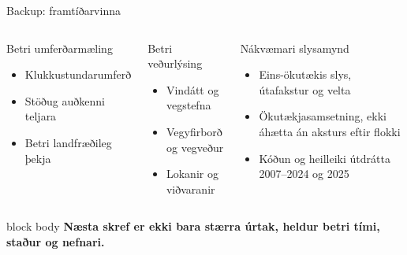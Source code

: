 \documentclass[aspectratio=169,11pt]{beamer}
\newcommand{\takeaway}[1]{%
  \begin{beamercolorbox}[rounded=true,sep=0.75em,wd=0.94\linewidth]{block body}
    \centering\color{navy}\bfseries #1
  \end{beamercolorbox}}
\begin{document}
\begin{frame}{Backup: framtíðarvinna}
\begin{columns}[T,onlytextwidth]
\begin{block}{Betri umferðarmæling}
\begin{itemize}\small
  \item Klukkustundarumferð
  \item Stöðug auðkenni teljara
  \item Betri landfræðileg þekja
\end{itemize}
\end{block}
\begin{block}{Betri veðurlýsing}
\begin{itemize}\small
  \item Vindátt og vegstefna
  \item Vegyfirborð og vegveður
  \item Lokanir og viðvaranir
\end{itemize}
\end{block}
\begin{alertblock}{Nákvæmari slysamynd}
\begin{itemize}\small
  \item Eins-ökutækis slys, útafakstur og velta
  \item Ökutækjasamsetning, ekki áhætta án aksturs eftir flokki
  \item Kóðun og heilleiki útdrátta 2007--2024 og 2025
\end{itemize}
\end{alertblock}
\end{columns}
\vfill
\takeaway{Næsta skref er ekki bara stærra úrtak, heldur betri tími, staður og nefnari.}
\end{frame}
\end{document}
